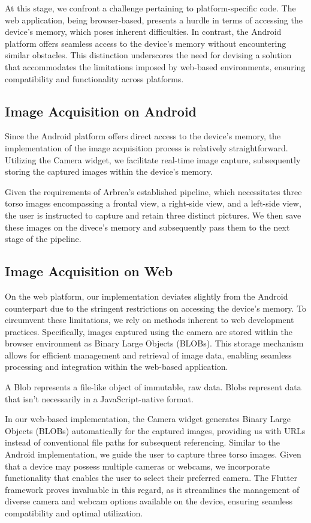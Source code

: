 At this stage, we confront a challenge pertaining to platform-specific code. The web application, being browser-based, presents a hurdle in terms of accessing the device's memory, 
which poses inherent difficulties. In contrast, the Android platform offers seamless access to the device's memory without encountering similar obstacles. 
This distinction underscores the need for devising a solution that accommodates the limitations imposed by web-based environments, ensuring compatibility and functionality across platforms.

\subsection{Image Acquisition on Android}

Since the Android platform offers direct access to the device's memory, the implementation of the image acquisition process is relatively straightforward. 
Utilizing the Camera widget, we facilitate real-time image capture, subsequently storing the captured images within the device's memory. 

Given the requirements of Arbrea's established pipeline, 
which necessitates three torso images encompassing a frontal view, a right-side view, and a left-side view, the user is instructed to capture and retain three distinct pictures. 
We then save these images on the divece's memory and subsequently pass them to the next stage of the pipeline.

\subsection{Image Acquisition on Web}

On the web platform, our implementation deviates slightly from the Android counterpart due to the stringent restrictions on accessing the device's memory. 
To circumvent these limitations, we rely on methods inherent to web development practices. Specifically, images captured using the camera are stored within the browser environment as Binary Large Objects (BLOBs). 
This storage mechanism allows for efficient management and retrieval of image data, enabling seamless processing and integration within the web-based application.

A Blob represents a file-like object of immutable, raw data. Blobs represent data that isn't necessarily in a JavaScript-native format. 

In our web-based implementation, the Camera widget generates Binary Large Objects (BLOBs) automatically for the captured images, providing us with URLs instead of conventional file paths for subsequent referencing. 
Similar to the Android implementation, we guide the user to capture three torso images. Given that a device may possess multiple cameras or webcams, we incorporate functionality that enables the user 
to select their preferred camera. The Flutter framework proves invaluable in this regard, as it streamlines the management of diverse camera and webcam options available on the device, 
ensuring seamless compatibility and optimal utilization.

